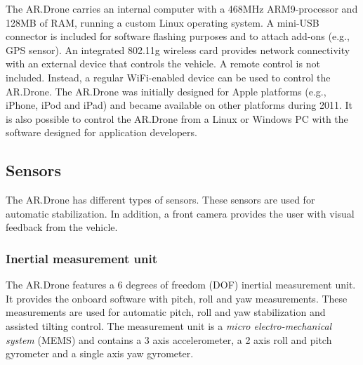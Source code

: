 The AR.Drone carries an internal computer with a 468MHz ARM9-processor and 128MB of RAM, running a custom Linux operating system.
A mini-USB connector is included for software flashing purposes and to attach add-ons (e.g., GPS sensor).
An integrated 802.11g wireless card provides network connectivity with an external device that controls the vehicle.
A remote control is not included. Instead, a regular WiFi-enabled device can be used to control the AR.Drone.
The AR.Drone was initially designed for Apple platforms (e.g., iPhone, iPod and iPad) and became available on other platforms during 2011.
It is also possible to control the AR.Drone from a Linux or Windows PC with the software designed for application developers.



\subsection{Sensors}
The AR.Drone has different types of sensors.
These sensors are used for automatic stabilization.
In addition, a front camera provides the user with visual feedback from the vehicle.


\subsubsection{Inertial measurement unit}
The AR.Drone features a 6 degrees of freedom (DOF) inertial measurement unit.
It provides the onboard software with pitch, roll and yaw measurements.
These measurements are used for automatic pitch, roll and yaw stabilization and assisted tilting control.
The measurement unit is a \textit{micro electro-mechanical system} (MEMS) and contains
a 3 axis accelerometer, a 2 axis roll and pitch gyrometer and a single axis yaw gyrometer.

